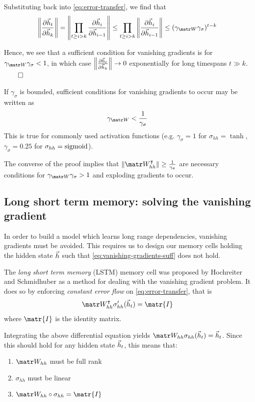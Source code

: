 \documentclass[dissertation.tex]{subfiles}
\begin{document}
Substituting back into \autoref{eq:error-transfer}, we find that
\begin{equation}
    \left\| \frac{\pd \h_t}{\pd \h_k} \right\|
    = \left\| \prod_{t \geq i > k} \frac{\pd \h_i}{\pd \h_{i-1}} \right\|
    \leq  \prod_{t \geq i > k} \left\| \frac{\pd \h_i}{\pd \h_{i-1}} \right\|
    \leq (\gamma_{\W} \gamma_\sigma)^{t-k}
\end{equation}

Hence, we see that a sufficient condition for vanishing gradients is
for $\gamma_{\W} \gamma_\sigma < 1$, in which case $\left\| \frac{\partial \vec{h}_t}{\partial \vec{h}_k} \right\| \to 0$
exponentially for long timespans $t \gg k$. $\qed$

If $\gamma_\sigma$ is bounded, sufficient
conditions for vanishing gradients to occur may be written as
\begin{equation}
    \gamma_{\W} < \frac{1}{\gamma_\sigma}
    \label{eq:vanishing-gradients-suff}
\end{equation}
This is true for commonly used activation functions (e.g. $\gamma_\sigma = 1$
for $\sigma_{hh} = \tanh$, $\gamma_\sigma = 0.25$ for $\sigma_{hh} =
\operatorname*{sigmoid}$). 

The converse of the proof implies that $\| \W_{hh}^\tp \| \geq
\frac{1}{\gamma_\sigma}$ are necessary conditions for $\gamma_{\W}
\gamma_\sigma > 1$ and exploding gradients to occur.

\subsection{Long short term memory: solving the vanishing gradient}

In order to build a model which learns long range dependencies, vanishing
gradients must be avoided. This requires us to design our memory cells holding
the hidden state $\vec{h}$ such that \autoref{eq:vanishing-gradients-suff} does
not hold.

The \emph{long short term memory} (LSTM) memory cell was proposed by Hochreiter and
Schmidhuber \cite{hochreiter1997long} as a method for dealing with
the vanishing gradient problem. It does so by enforcing \emph{constant error flow}
on \autoref{eq:error-transfer}, that is
\begin{equation}
    \W_{hh}^\tp \sigma_{hh}' (\h_{t}) = \matr{I}
\end{equation}
where $\matr{I}$ is the identity matrix.

Integrating the above differential equation yields $\W_{hh} \sigma_{hh}(\h_{t}) = \h_{t}$.
Since this should hold for any hidden state $\vec{h}_{t}$, this means that:
\begin{enumerate}
    \item $\W_{hh}$ must be full rank
    \item $\sigma_{hh}$ must be linear
    \item $\W_{hh} \circ \sigma_{hh} = \matr{I}$
\end{enumerate}
\end{document}
